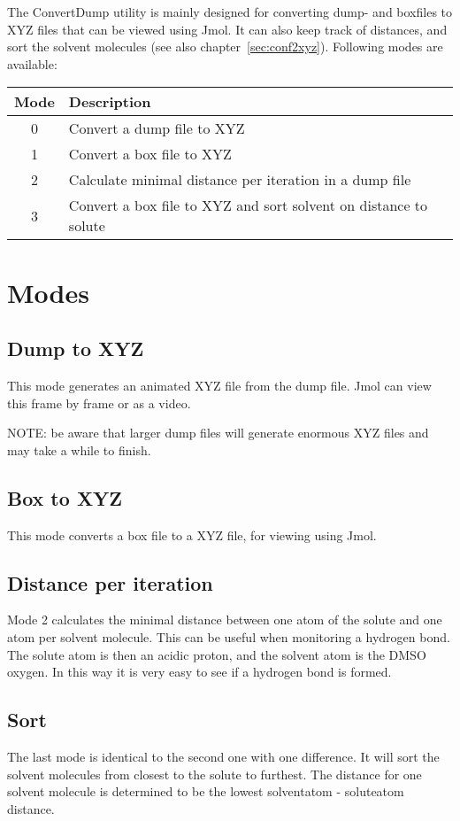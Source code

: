 
The ConvertDump utility is mainly designed for converting dump- and boxfiles to 
XYZ files that can be viewed using Jmol. It can also keep track of distances, 
and sort the solvent molecules (see also chapter~\ref{sec:conf2xyz}). Following 
modes are available:

\begin{tabular}{cl}
	Mode & Description \\ \hline
	0 & Convert a dump file to XYZ \\
	1 & Convert a box file to XYZ \\
	2 & Calculate minimal distance per iteration in a dump file \\
	3 & Convert a box file to XYZ and sort solvent on distance to solute
\end{tabular}

\section{Modes}
\subsection{Dump to XYZ}
This mode generates an animated XYZ file from the dump file. Jmol can view this 
frame by frame or as a video.

NOTE: be aware that larger dump files will generate enormous XYZ files and may 
take a while to finish.

\subsection{Box to XYZ}
This mode converts a box file to a XYZ file, for viewing using Jmol.

\subsection{Distance per iteration}
Mode 2 calculates the minimal distance between one atom of the solute and one 
atom per solvent molecule. This can be useful when monitoring a hydrogen bond. 
The solute atom is then an acidic proton, and the solvent atom is the DMSO 
oxygen. In this way it is very easy to see if a hydrogen bond is formed.

\subsection{Sort}
The last mode is identical to the second one with one difference. It will sort 
the solvent molecules from closest to the solute to furthest. The distance for 
one solvent molecule is determined to be the lowest solventatom - soluteatom 
distance.

